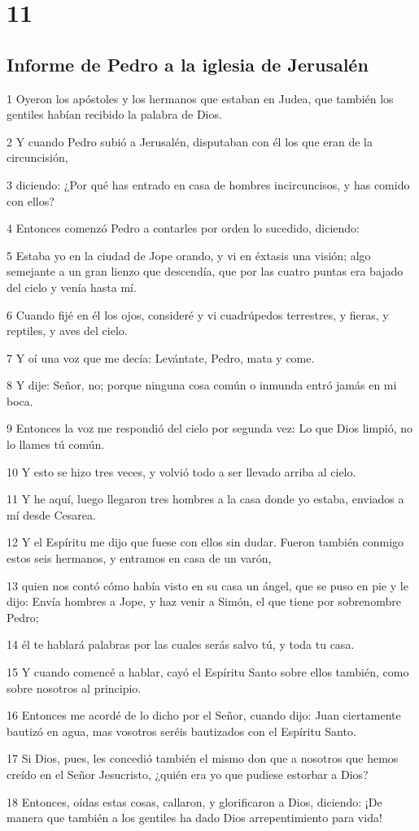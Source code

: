 \chapter{11}

\section*{Informe de Pedro a la iglesia de Jerusalén}

\par 1 Oyeron los apóstoles y los hermanos que estaban en Judea, que también los gentiles habían recibido la palabra de Dios.
\par 2 Y cuando Pedro subió a Jerusalén, disputaban con él los que eran de la circuncisión,
\par 3 diciendo: ¿Por qué has entrado en casa de hombres incircuncisos, y has comido con ellos?
\par 4 Entonces comenzó Pedro a contarles por orden lo sucedido, diciendo:
\par 5 Estaba yo en la ciudad de Jope orando, y vi en éxtasis una visión; algo semejante a un gran lienzo que descendía, que por las cuatro puntas era bajado del cielo y venía hasta mí.
\par 6 Cuando fijé en él los ojos, consideré y vi cuadrúpedos terrestres, y fieras, y reptiles, y aves del cielo.
\par 7 Y oí una voz que me decía: Levántate, Pedro, mata y come.
\par 8 Y dije: Señor, no; porque ninguna cosa común o inmunda entró jamás en mi boca.
\par 9 Entonces la voz me respondió del cielo por segunda vez: Lo que Dios limpió, no lo llames tú común.
\par 10 Y esto se hizo tres veces, y volvió todo a ser llevado arriba al cielo.
\par 11 Y he aquí, luego llegaron tres hombres a la casa donde yo estaba, enviados a mí desde Cesarea.
\par 12 Y el Espíritu me dijo que fuese con ellos sin dudar. Fueron también conmigo estos seis hermanos, y entramos en casa de un varón,
\par 13 quien nos contó cómo había visto en su casa un ángel, que se puso en pie y le dijo: Envía hombres a Jope, y haz venir a Simón, el que tiene por sobrenombre Pedro;
\par 14 él te hablará palabras por las cuales serás salvo tú, y toda tu casa.
\par 15 Y cuando comencé a hablar, cayó el Espíritu Santo sobre ellos también, como sobre nosotros al principio.
\par 16 Entonces me acordé de lo dicho por el Señor, cuando dijo: Juan ciertamente bautizó en agua, mas vosotros seréis bautizados con el Espíritu Santo.
\par 17 Si Dios, pues, les concedió también el mismo don que a nosotros que hemos creído en el Señor Jesucristo, ¿quién era yo que pudiese estorbar a Dios?
\par 18 Entonces, oídas estas cosas, callaron, y glorificaron a Dios, diciendo: ¡De manera que también a los gentiles ha dado Dios arrepentimiento para vida!

